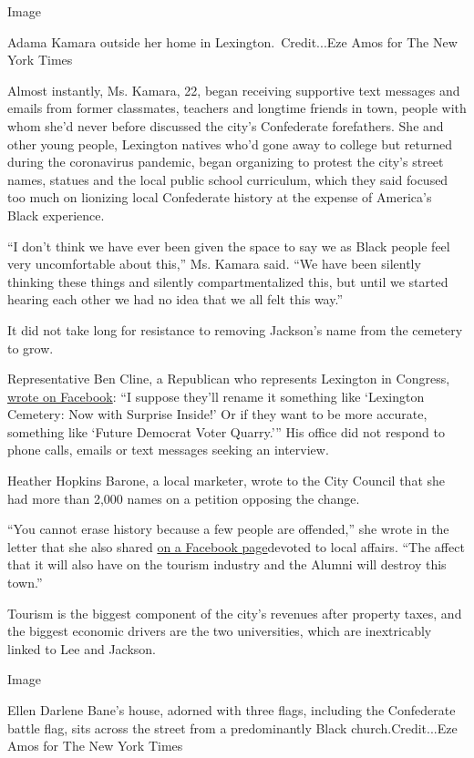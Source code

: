 Image

Adama Kamara outside her home in Lexington.~Credit...Eze Amos for The
New York Times

Almost instantly, Ms. Kamara, 22, began receiving supportive text
messages and emails from former classmates, teachers and longtime
friends in town, people with whom she'd never before discussed the
city's Confederate forefathers. She and other young people, Lexington
natives who'd gone away to college but returned during the coronavirus
pandemic, began organizing to protest the city's street names, statues
and the local public school curriculum, which they said focused too much
on lionizing local Confederate history at the expense of America's Black
experience.

``I don't think we have ever been given the space to say we as Black
people feel very uncomfortable about this,'' Ms. Kamara said. ``We have
been silently thinking these things and silently compartmentalized this,
but until we started hearing each other we had no idea that we all felt
this way.''

It did not take long for resistance to removing Jackson's name from the
cemetery to grow.

Representative Ben Cline, a Republican who represents Lexington in
Congress,
\href{https://www.facebookcorewwwi.onion/48631937877/posts/10158889404357878/?d=n}{wrote
on Facebook}: ``I suppose they'll rename it something like `Lexington
Cemetery: Now with Surprise Inside!' Or if they want to be more
accurate, something like `Future Democrat Voter Quarry.''' His office
did not respond to phone calls, emails or text messages seeking an
interview.

Heather Hopkins Barone, a local marketer, wrote to the City Council that
she had more than 2,000 names on a petition opposing the change.

``You cannot erase history because a few people are offended,'' she
wrote in the letter that she also shared
\href{https://www.facebookcorewwwi.onion/historicdowntownlexingtonvirginia/posts/1897047810425491}{on
a Facebook page}devoted to local affairs. ``The affect that it will also
have on the tourism industry and the Alumni will destroy this town.''

Tourism is the biggest component of the city's revenues after property
taxes, and the biggest economic drivers are the two universities, which
are inextricably linked to Lee and Jackson.

Image

Ellen Darlene Bane's house, adorned with three flags, including the
Confederate battle flag, sits across the street from a predominantly
Black church.Credit...Eze Amos for The New York Times

